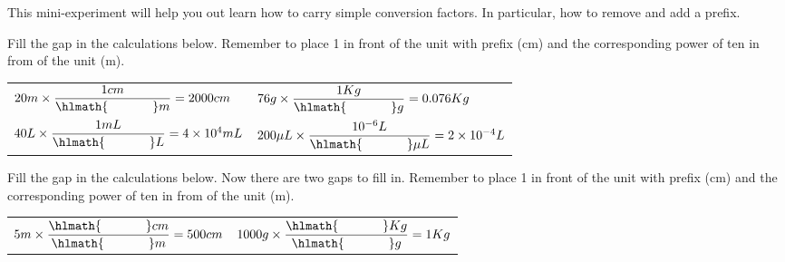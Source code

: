 \documentclass[main.tex]{subfiles}
\begin{document}
\vspace{0.2cm}{\large \bfseries 4. Simple conversion factors }
This mini-experiment will help you out learn how to carry simple conversion factors. In particular, how to remove and add a prefix.
\begin{steps}
        \newstep[]  Fill the gap in the calculations below. Remember to place 1 in front of the unit with prefix (cm) and the corresponding power of ten in from of the unit (m).
  
\begin{center}
 \begin{tabular}{ p{6cm}   p{6cm}  }
 $20m\times\dfrac{1cm}{\hlmath{\hspace{35pt }}m}=2000cm$				&
 $76g\times\dfrac{1Kg}{\hlmath{\hspace{35pt }}g}=0.076Kg$							\\[0.5cm]     
 
  $40L\times\dfrac{1mL}{\hlmath{\hspace{35pt }}L}=4\times 10^4mL$				&
 $200\mu L\times\dfrac{10^{-6} L}{\hlmath{\hspace{35pt }}\mu L}=2\times 10^{-4} L$							\\[0.5cm] 
 
 \end{tabular}\end{center}\vspace{.1cm}


         \newstep[]  Fill the gap in the calculations below. Now there are two gaps to fill in. Remember to place 1 in front of the unit with prefix (cm) and the corresponding power of ten in from of the unit (m).

\begin{center}
 \begin{tabular}{ p{6cm}   p{6cm}  }
 $5m\times\dfrac{\hlmath{\hspace{35pt }}cm}{\hlmath{\hspace{35pt }}m}=500cm$				&
 $1000g\times\dfrac{\hlmath{\hspace{35pt }}Kg}{\hlmath{\hspace{35pt }}g}=1Kg$							\\[0.5cm]     
 

\end{tabular}
\end{center}
\end{steps}
\end{document}
